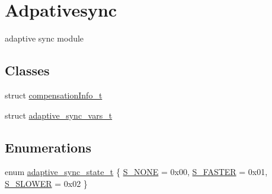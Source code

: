 \hypertarget{group__adpativesync}{}\section{Adpativesync}
\label{group__adpativesync}


adaptive sync module  


\subsection*{Classes}
\begin{DoxyCompactItemize}
\item 
struct \hyperlink{structcompensation_info__t}{compensation\+Info\+\_\+t}
\item 
struct \hyperlink{structadaptive__sync__vars__t}{adaptive\+\_\+sync\+\_\+vars\+\_\+t}
\end{DoxyCompactItemize}
\subsection*{Enumerations}
\begin{DoxyCompactItemize}
\item 
enum \hyperlink{group__adpativesync_gac81060fb836128f6649b1249f2eca999}{adaptive\+\_\+sync\+\_\+state\+\_\+t} \{ \hyperlink{group__adpativesync_ggac81060fb836128f6649b1249f2eca999acb5ec123e88fa0c9a1548d1f05b03e0f}{S\+\_\+\+N\+O\+NE} = 0x00, 
\hyperlink{group__adpativesync_ggac81060fb836128f6649b1249f2eca999a04968eb2fb707873f1ef525cc2dcdaca}{S\+\_\+\+F\+A\+S\+T\+ER} = 0x01, 
\hyperlink{group__adpativesync_ggac81060fb836128f6649b1249f2eca999a9687b49b1490ae284f1be634573de4ee}{S\+\_\+\+S\+L\+O\+W\+ER} = 0x02
 \}
\end{DoxyCompactItemize}
